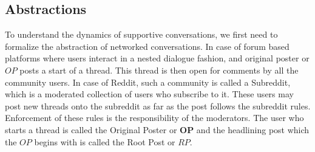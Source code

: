 \subsection{Abstractions}
\label{Sec:Abstractions}
To understand the dynamics of supportive conversations, we first need to formalize the abstraction of networked conversations. In case of forum based platforms where users interact in a nested dialogue fashion, and original poster or $OP$ posts a start of a thread. This thread is then open for comments by all the community users. In case of Reddit, such a community is called a Subreddit, which is a moderated collection of users who subscribe to it. These users may post new threads onto the subreddit as far as the post follows the subreddit rules. Enforcement of these rules is the responsibility of the moderators. The user who starts a thread is called the Original Poster or \textbf{OP} and the headlining post which the $OP$ begins with is called the Root Post or $RP$. 


\label{Sec:network}

